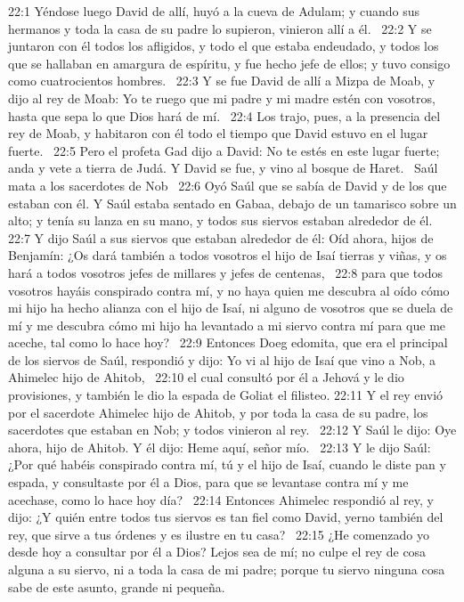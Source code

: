 22:1 Yéndose luego David de allí, huyó a la cueva de Adulam; y cuando sus hermanos y toda la casa de su padre lo supieron, vinieron allí a él.  
22:2 Y se juntaron con él todos los afligidos, y todo el que estaba endeudado, y todos los que se hallaban en amargura de espíritu, y fue hecho jefe de ellos; y tuvo consigo como cuatrocientos hombres.  
22:3 Y se fue David de allí a Mizpa de Moab, y dijo al rey de Moab: Yo te ruego que mi padre y mi madre estén con vosotros, hasta que sepa lo que Dios hará de mí.  
22:4 Los trajo, pues, a la presencia del rey de Moab, y habitaron con él todo el tiempo que David estuvo en el lugar fuerte.  
22:5 Pero el profeta Gad dijo a David: No te estés en este lugar fuerte; anda y vete a tierra de Judá. Y David se fue, y vino al bosque de Haret.  
Saúl mata a los sacerdotes de Nob  
22:6 Oyó Saúl que se sabía de David y de los que estaban con él. Y Saúl estaba sentado en Gabaa, debajo de un tamarisco sobre un alto; y tenía su lanza en su mano, y todos sus siervos estaban alrededor de él.  
22:7 Y dijo Saúl a sus siervos que estaban alrededor de él: Oíd ahora, hijos de Benjamín: ¿Os dará también a todos vosotros el hijo de Isaí tierras y viñas, y os hará a todos vosotros jefes de millares y jefes de centenas,  
22:8 para que todos vosotros hayáis conspirado contra mí, y no haya quien me descubra al oído cómo mi hijo ha hecho alianza con el hijo de Isaí, ni alguno de vosotros que se duela de mí y me descubra cómo mi hijo ha levantado a mi siervo contra mí para que me aceche, tal como lo hace hoy?  
22:9 Entonces Doeg edomita, que era el principal de los siervos de Saúl, respondió y dijo: Yo vi al hijo de Isaí que vino a Nob, a Ahimelec hijo de Ahitob,  
22:10 el cual consultó por él a Jehová y le dio provisiones, y también le dio la espada de Goliat el filisteo. 
22:11 Y el rey envió por el sacerdote Ahimelec hijo de Ahitob, y por toda la casa de su padre, los sacerdotes que estaban en Nob; y todos vinieron al rey.  
22:12 Y Saúl le dijo: Oye ahora, hijo de Ahitob. Y él dijo: Heme aquí, señor mío.  
22:13 Y le dijo Saúl: ¿Por qué habéis conspirado contra mí, tú y el hijo de Isaí, cuando le diste pan y espada, y consultaste por él a Dios, para que se levantase contra mí y me acechase, como lo hace hoy día?  
22:14 Entonces Ahimelec respondió al rey, y dijo: ¿Y quién entre todos tus siervos es tan fiel como David, yerno también del rey, que sirve a tus órdenes y es ilustre en tu casa?  
22:15 ¿He comenzado yo desde hoy a consultar por él a Dios? Lejos sea de mí; no culpe el rey de cosa alguna a su siervo, ni a toda la casa de mi padre; porque tu siervo ninguna cosa sabe de este asunto, grande ni pequeña.  
